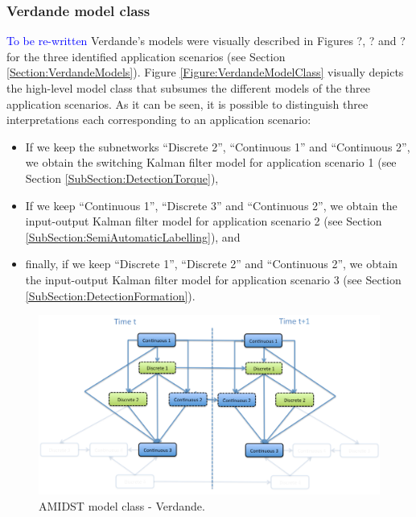 \subsubsection{Verdande model class}
\textcolor{blue}{To be re-written}
Verdande's models were visually described in Figures ?, ? and ? for the three identified application scenarios (see Section \ref{Section:VerdandeModels}). Figure \ref{Figure:VerdandeModelClass} visually depicts the high-level model class that subsumes the different models of the three application scenarios. As it can be seen, it is possible to distinguish three interpretations each corresponding to an application scenario:

\begin{itemize}
\item If we keep the subnetworks ``Discrete 2'', ``Continuous 1'' and ``Continuous 2'', we obtain the switching Kalman filter model for application scenario 1 (see Section \ref{SubSection:DetectionTorque}),
\item If we keep ``Continuous 1'', ``Discrete 3'' and ``Continuous 2'', we obtain the input-output Kalman filter model for application scenario 2 (see Section \ref{SubSection:SemiAutomaticLabelling}), and
\item finally, if we keep ``Discrete 1'', ``Discrete 2'' and ``Continuous 2'', we obtain the input-output Kalman filter model for application scenario 3  (see Section \ref{SubSection:DetectionFormation}).
\end{itemize}



\begin{figure}[ht!]
\begin{center}
\includegraphics[scale=0.39]{./figures/AMIDSTModelClassVerdande}
\caption{\label{Figure:AMIDSTModelClassVerdande} AMIDST model class - Verdande.}
\end{center}
\end{figure}

